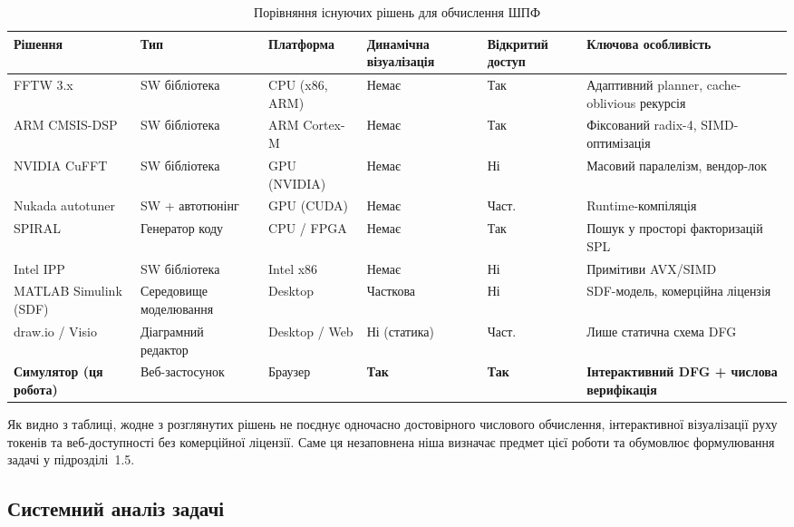 \begin{table}[H]
  \caption{Порівняння існуючих рішень для обчислення ШПФ}
  \label{tab:solutions}
  \centering
  \small
  \begin{tabular}{p{2.4cm}p{2.0cm}p{1.8cm}p{1.6cm}p{1.8cm}p{2.4cm}}
    \toprule
    Рішення & Тип & Платформа & Динамічна візуалізація & Відкритий доступ & Ключова особливість \\
    \midrule
    FFTW 3.x & SW бібліотека & CPU (x86, ARM) & Немає & Так & Адаптивний planner, cache-oblivious рекурсія~\cite{frigo2005} \\[2pt]
    ARM CMSIS-DSP & SW бібліотека & ARM Cortex-M & Немає & Так & Фіксований radix-4, SIMD-оптимізація~\cite{cmsis_dsp} \\[2pt]
    NVIDIA CuFFT & SW бібліотека & GPU (NVIDIA) & Немає & Ні & Масовий паралелізм, вендор-лок~\cite{du2012} \\[2pt]
    Nukada autotuner & SW + автотюнінг & GPU (CUDA) & Немає & Част. & Runtime-компіляція~\cite{nukada2009} \\[2pt]
    SPIRAL & Генератор коду & CPU / FPGA & Немає & Так & Пошук у просторі факторизацій SPL~\cite{puschel2004} \\[2pt]
    Intel IPP & SW бібліотека & Intel x86 & Немає & Ні & Примітиви AVX/SIMD~\cite{intel_ipp} \\[2pt]
    MATLAB Simulink (SDF) & Середовище моделювання & Desktop & Часткова & Ні & SDF-модель, комерційна ліцензія \\[2pt]
    draw.io / Visio & Діаграмний редактор & Desktop / Web & Ні (статика) & Част. & Лише статична схема DFG \\[2pt]
    \textbf{Симулятор (ця робота)} & Веб-застосунок & Браузер & \textbf{Так} & \textbf{Так} & \textbf{Інтерактивний DFG + числова верифікація} \\
    \bottomrule
  \end{tabular}
\end{table}

Як видно з таблиці, жодне з розглянутих рішень не поєднує одночасно
достовірного числового обчислення, інтерактивної візуалізації руху
токенів та веб-доступності без комерційної ліцензії. Саме ця
незаповнена ніша визначає предмет цієї роботи та обумовлює
формулювання задачі у підрозділі~1.5.


\subsection{Системний аналіз задачі}


